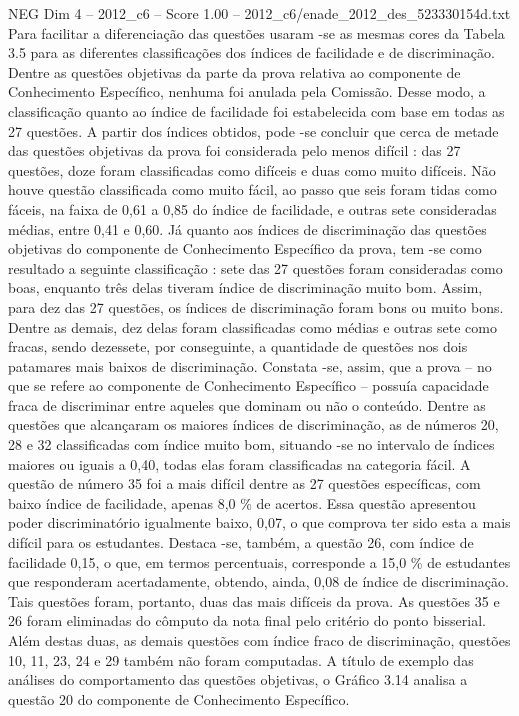 \begin{textsample}{NEG Dim 4 – 2012\_c6 – Score 1.00 – 2012\_c6/enade\_2012\_des\_523330154d.txt}
Para facilitar a diferenciação das questões usaram -se as mesmas cores da Tabela 3.5 para as diferentes classificações dos índices de facilidade e de discriminação.
Dentre as questões objetivas da parte da prova relativa ao componente de Conhecimento Específico, nenhuma foi anulada pela Comissão.
Desse modo, a classificação quanto ao índice de facilidade foi estabelecida com base em todas as 27 questões.
A partir dos índices obtidos, pode -se concluir que cerca de metade das questões objetivas da prova foi considerada pelo menos difícil : das 27 questões, doze foram classificadas como difíceis e duas como muito difíceis.
Não houve questão classificada como muito fácil, ao passo que seis foram tidas como fáceis, na faixa de 0,61 a 0,85 do índice de facilidade, e outras sete consideradas médias, entre 0,41 e 0,60.
Já quanto aos índices de discriminação das questões objetivas do componente de Conhecimento Específico da prova, tem -se como resultado a seguinte classificação : sete das 27 questões foram consideradas como boas, enquanto três delas tiveram índice de discriminação muito bom.
Assim, para dez das 27 questões, os índices de discriminação foram bons ou muito bons.
Dentre as demais, dez delas foram classificadas como médias e outras sete como fracas, sendo dezessete, por conseguinte, a quantidade de questões nos dois patamares mais baixos de discriminação.
Constata -se, assim, que a prova – no que se refere ao componente de Conhecimento Específico – possuía capacidade fraca de discriminar entre aqueles que dominam ou não o conteúdo.
Dentre as questões que alcançaram os maiores índices de discriminação, as de números 20, 28 e 32 classificadas com índice muito bom, situando -se no intervalo de índices maiores ou iguais a 0,40, todas elas foram classificadas na categoria fácil.
A questão de número 35 foi a mais difícil dentre as 27 questões específicas, com baixo índice de facilidade, apenas 8,0 \% de acertos.
Essa questão apresentou poder discriminatório igualmente baixo, 0,07, o que comprova ter sido esta a mais difícil para os estudantes.
Destaca -se, também, a questão 26, com índice de facilidade 0,15, o que, em termos percentuais, corresponde a 15,0 \% de estudantes que responderam acertadamente, obtendo, ainda, 0,08 de índice de discriminação.
Tais questões foram, portanto, duas das mais difíceis da prova.
As questões 35 e 26 foram eliminadas do cômputo da nota final pelo critério do ponto bisserial.
Além destas duas, as demais questões com índice fraco de discriminação, questões 10, 11, 23, 24 e 29 também não foram computadas.
A título de exemplo das análises do comportamento das questões objetivas, o Gráfico 3.14 analisa a questão 20 do componente de Conhecimento Específico.

\end{textsample}
